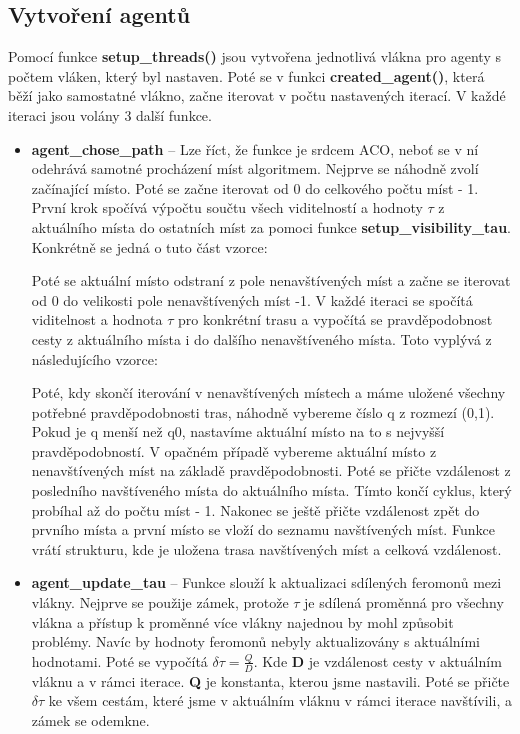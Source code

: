 \subsection{Vytvoření agentů}
Pomocí funkce \textbf{setup\_threads()} jsou vytvořena jednotlivá vlákna pro agenty s počtem vláken, který byl nastaven. Poté se v funkci \textbf{created\_agent()}, která běží jako samostatné vlákno, začne iterovat v počtu nastavených iterací. V každé iteraci jsou volány 3 další funkce.
\begin{itemize}
\item \textbf{agent\_chose\_path} -- Lze říct, že funkce je srdcem ACO, neboť se v ní odehrává samotné procházení míst algoritmem. Nejprve se náhodně zvolí začínající místo. Poté se začne iterovat od 0 do celkového počtu míst - 1. První krok spočívá výpočtu součtu všech viditelností a hodnoty $\tau$ z aktuálního místa do ostatních míst za pomoci funkce \textbf{setup\_visibility\_tau}. Konkrétně se jedná o tuto část vzorce:
\begin{center}
\end{center}
Poté se aktuální místo odstraní z pole nenavštívených míst a začne se iterovat od 0 do velikosti pole nenavštívených míst -1. V každé iteraci se spočítá viditelnost a hodnota $\tau$ pro konkrétní trasu a vypočítá se pravděpodobnost cesty z aktuálního místa i do dalšího nenavštíveného místa. Toto vyplývá z následujícího vzorce:
    \begin{center}
    \end{center}
    Poté, kdy skončí iterování v nenavštívených místech a máme uložené všechny potřebné pravděpodobnosti tras, náhodně vybereme číslo q z rozmezí (0,1). Pokud je q menší než q0, nastavíme aktuální místo na to s nejvyšší pravděpodobností. V opačném případě vybereme aktuální místo z nenavštívených míst na základě pravděpodobnosti. Poté se přičte vzdálenost z posledního navštíveného místa do aktuálního místa. Tímto končí cyklus, který probíhal až do počtu míst - 1. Nakonec se ještě přičte vzdálenost zpět do prvního místa a první místo se vloží do seznamu navštívených míst. Funkce vrátí strukturu, kde je uložena trasa navštívených míst a celková vzdálenost.
    \item \textbf{agent\_update\_tau} --
     Funkce slouží k aktualizaci sdílených feromonů mezi vlákny. Nejprve se použije zámek, protože $\tau$ je sdílená proměnná pro všechny vlákna a přístup k proměnné více vlákny najednou by mohl způsobit problémy. Navíc by hodnoty feromonů nebyly aktualizovány s aktuálními hodnotami. Poté se vypočítá $\delta\tau=\frac{Q}{D}$. Kde \textbf{D} je vzdálenost cesty v aktuálním vláknu a v rámci iterace. \textbf{Q} je konstanta, kterou jsme nastavili. Poté se přičte $\delta\tau$ ke všem cestám, které jsme v aktuálním vláknu v rámci iterace navštívili, a zámek se odemkne.
    

\end{itemize}
